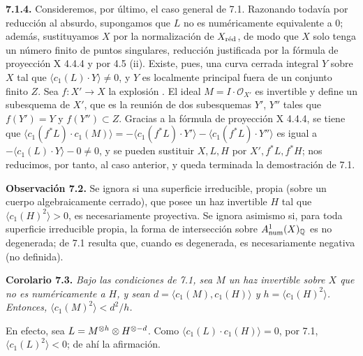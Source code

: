 \textbf{7.1.4.} Consideremos, por último, el caso general de 7.1. Razonando todavía por reducción al absurdo, supongamos que $L$ no es numéricamente equivalente a $0$; además, sustituyamos $X$ por la normalización de $X_{\red}$, de modo que $X$ solo tenga un número finito de puntos singulares, reducción justificada por la fórmula de proyección X 4.4.4 y por 4.5 (ii). Existe, pues, una curva cerrada integral $Y$ sobre $X$ tal que $\langle c_1(L)\cdot Y\rangle\ne0$, y $Y$ es localmente principal fuera de un conjunto finito $Z$. Sea $f:X'\to X$ la explosión . El ideal $M=I\cdot\mathcal O_{X'}$ es invertible y define un subesquema de $X'$, que es la reunión de dos subesquemas $Y'$, $Y''$ tales que $f(Y')=Y$ y $f(Y'')\subset Z$. Gracias a la fórmula de proyección X 4.4.4, se tiene que $\langle c_1(f^*L)\cdot c_1(M)\rangle=-\langle c_1(f^*L)\cdot Y'\rangle-\langle c_1(f^*L)\cdot Y''\rangle$ es igual a $-\langle c_1(L)\cdot Y\rangle-0\ne0$, y se pueden sustituir $X,L,H$ por $X',f^*L,f^*H$; nos reducimos, por tanto, al caso anterior, y queda terminada la demostración de 7.1. %

\textbf{Observación 7.2.} Se ignora si una superficie irreducible, propia (sobre un cuerpo algebraicamente cerrado), que posee un haz invertible $H$ tal que $\langle c_1(H)^2\rangle>0$, es necesariamente proyectiva. Se ignora asimismo si, para toda superficie irreducible propia, la forma de intersección sobre $A^1_{\mathrm{num}}(X)_{\Q}$ es no degenerada; de 7.1 resulta que, cuando es degenerada, es necesariamente negativa (no definida).

\textbf{Corolario 7.3.} \emph{Bajo las condiciones de 7.1, sea $M$ un haz invertible sobre $X$ que no es numéricamente  a $H$, y sean $d=\langle c_1(M),c_1(H)\rangle$ y $h=\langle c_1(H)^2\rangle$. Entonces, $\langle c_1(M)^2\rangle<d^2/h$.} %

En efecto, sea $L=M^{\otimes \sisi{n}{h}}\otimes H^{\otimes -d}$. Como $\langle c_1(L)\cdot c_1(H)\rangle=0$, por 7.1, $\langle c_1(L)^2\rangle<0$; de ahí la afirmación. %

